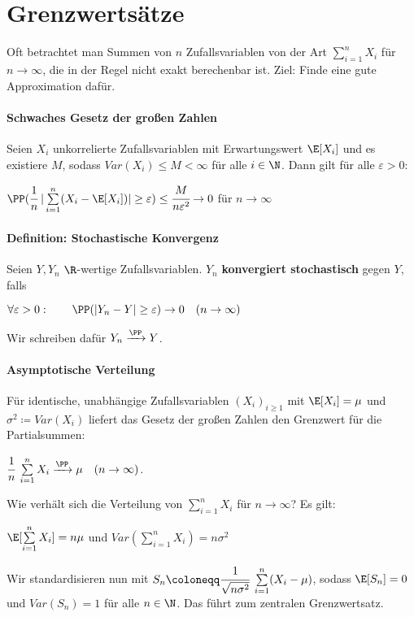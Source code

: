 \section{Grenzwertsätze}
Oft betrachtet man Summen von $n$ Zufallsvariablen von der Art $\sum\limits_{i=1}^{n}X_i$ für $n\rightarrow\infty$, die in der Regel nicht exakt berechenbar ist.
Ziel: Finde eine gute Approximation dafür.

\paragraph{Schwaches Gesetz der großen Zahlen}
Seien $X_i$ unkorrelierte Zufallsvariablen mit Erwartungswert $\E[X_i]$ und es existiere $M$, sodass $Var(X_i)\leq M<\infty$ für alle $i\in\N$.
Dann gilt für alle $\varepsilon>0$:
\begin{tightcenter}
	$\PP(\cfrac{1}{n}\;|\sum\limits_{i=1}^{n}(X_i-\E[X_i])|\geq\varepsilon)\leq\cfrac{M}{n\varepsilon^2}\rightarrow0$ \qquad für $n\rightarrow\infty$
\end{tightcenter}

\paragraph{Definition: Stochastische Konvergenz}
Seien $Y,Y_n$ $\R$-wertige Zufallsvariablen.
$Y_n$ \textbf{konvergiert stochastisch} gegen $Y$, falls
\begin{tightcenter} 
	$\forall\varepsilon>0:\qquad\PP(|Y_n-Y|\geq\varepsilon)\rightarrow0\quad(n\rightarrow\infty)$
\end{tightcenter}
Wir schreiben dafür $Y_n\xrightarrow{\PP}Y$.

\paragraph{Asymptotische Verteilung}
Für identische, unabhängige Zufallsvariablen $(X_i)_{i\geq1}$ mit $\E[X_i]=\mu$ und $\sigma^2\coloneqq Var(X_i)$ liefert das Gesetz der großen Zahlen den Grenzwert für die Partialsummen:
\begin{tightcenter}
	 $\cfrac{1}{n}\;\sum\limits_{i=1}^{n}X_i\xrightarrow{\PP}\mu\quad (n\rightarrow\infty)$.
\end{tightcenter}
Wie verhält sich die Verteilung von $\sum\limits_{i=1}^{n}X_i$ für $n\rightarrow\infty$? Es gilt:
\begin{tightcenter}
	$\E[\sum\limits_{i=1}^{n}X_i]=n\mu$ und $Var(\sum\limits_{i=1}^{n}X_i)=n\sigma^2$
\end{tightcenter}
Wir standardisieren nun mit $S_n\coloneqq\cfrac{1}{\sqrt{n\sigma^2}}\;\sum\limits_{i=1}^{n}(X_i-\mu)$, sodass $\E[S_n]=0$ und $Var(S_n)=1$ für alle $n\in\N$. 
Das führt zum zentralen Grenzwertsatz.

